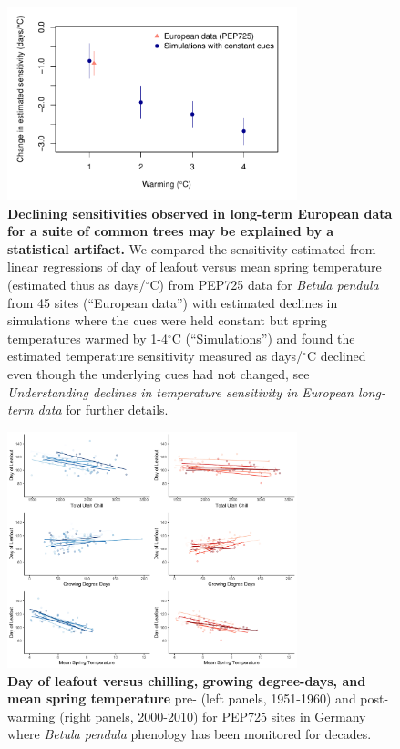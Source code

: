 \documentclass{article}
\begin{document}
\newpage
\begin{figure}[h!]
\centering
\noindent \includegraphics[width=0.75\textwidth]{..//..//analyses/bb_analysis/PEP_climate/figures/peprealandsims.pdf}
\caption{\textbf{Declining sensitivities observed in long-term European data for a suite of common trees may be explained by a statistical artifact.} We compared the sensitivity estimated from linear regressions of day of leafout versus mean spring temperature (estimated thus as days/$^{\circ}$C) from PEP725 data for \emph{Betula pendula} from 45 sites (``European data'') with estimated declines in simulations where the cues were held constant but spring temperatures warmed by 1-4$^{\circ}$C (``Simulations'') and found the estimated temperature sensitivity measured as days/$^{\circ}$C declined even though the underlying cues had not changed, see \emph{Understanding declines in temperature sensitivity in European long-term data} for further details.}
\label{fig:pepsims}
\end{figure}

\newpage
\begin{figure}[h!]
\centering
\noindent \includegraphics[width=0.75\textwidth]{..//..//analyses/bb_analysis/PEP_climate/figures/betpen_multruns_utahgddmat.pdf}
\caption{\textbf{Day of leafout versus chilling, growing degree-days, and mean spring temperature} pre- (left panels, 1951-1960) and post-warming (right panels, 2000-2010) for PEP725 sites in Germany where \emph{Betula pendula} phenology has been monitored for decades.}
\label{fig:pep}
\end{figure}
\end{document}
